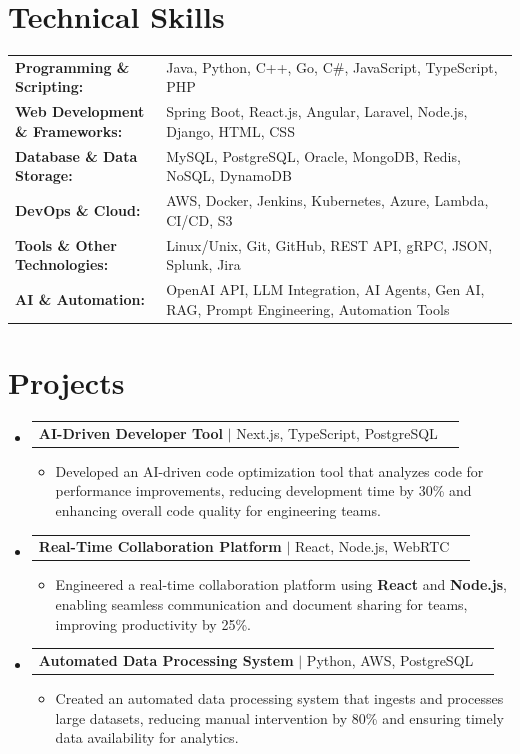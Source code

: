 \documentclass[letterpaper,10pt]{article}
\makeatletter
\newcommand{\resumeItem}[1]{
  \item{\fontsize{8pt}{9pt}\selectfont
    #1 \vspace{-3pt}
  }
}
\newcommand{\resumeProjectHeading}[2]{
    \item
    \begin{tabular*}{1.001\textwidth}{l@{\extracolsep{\fill}}r}
      \fontsize{8.5pt}{10pt}#1 & \textbf{\fontsize{8.5pt}{10pt} #2}\\
    \end{tabular*}\vspace{-7pt}
}
\newcommand{\resumeSubHeadingListStart}{\begin{itemize}[leftmargin=0pt, label={}]}
\newcommand{\resumeSubHeadingListEnd}{\end{itemize}}
\newcommand{\resumeItemListStart}{\begin{itemize}[leftmargin=*]}
\newcommand{\resumeItemListEnd}{\end{itemize}\vspace{-5pt}}
\makeatother
\begin{document}
\section{Technical Skills}
        \vspace{-14pt}
        \begin{table}[h]
            \fontsize{8pt}{9pt}\selectfont
            \begin{tabular}{p{0.3\linewidth} p{0.7\linewidth}}
                \textbf{Programming \& Scripting:} & Java, Python, C++, Go, C\#, JavaScript, TypeScript, PHP \\
                \textbf{Web Development \& Frameworks:} & Spring Boot, React.js, Angular, Laravel, Node.js, Django, HTML, CSS \\
                \textbf{Database \& Data Storage:} & MySQL, PostgreSQL, Oracle, MongoDB, Redis, NoSQL, DynamoDB \\
                \textbf{DevOps \& Cloud:} & AWS, Docker, Jenkins, Kubernetes, Azure, Lambda, CI/CD, S3 \\
                \textbf{Tools \& Other Technologies:} & Linux/Unix, Git, GitHub, REST API, gRPC, JSON, Splunk, Jira \\
                \textbf{AI \& Automation:} & OpenAI API, LLM Integration, AI Agents, Gen AI, RAG, Prompt Engineering, Automation Tools \\
            \end{tabular}
        \end{table}
 \vspace{-18pt}

\section{Projects}
    \vspace{-5pt}
    \resumeSubHeadingListStart
          \resumeProjectHeading
            {\textbf{AI-Driven Developer Tool} $|$ Next.js, TypeScript, PostgreSQL}{}
            \resumeItemListStart
                \resumeItem{Developed an AI-driven code optimization tool that analyzes code for performance improvements, reducing development time by 30\% and enhancing overall code quality for engineering teams.}
            \resumeItemListEnd
        \vspace{-12pt}
    
        \resumeProjectHeading
            {\textbf{Real-Time Collaboration Platform} $|$ React, Node.js, WebRTC}{}
        \resumeItemListStart
                \resumeItem{Engineered a real-time collaboration platform using \textbf{React} and \textbf{Node.js}, enabling seamless communication and document sharing for teams, improving productivity by 25\%.}
        \resumeItemListEnd
      \vspace{-12pt}
      \resumeProjectHeading
        {\textbf{Automated Data Processing System} $|$ Python, AWS, PostgreSQL}{}
    \resumeItemListStart
            \resumeItem{Created an automated data processing system that ingests and processes large datasets, reducing manual intervention by 80\% and ensuring timely data availability for analytics.}
    \resumeItemListEnd
    \resumeSubHeadingListEnd
\end{document}

